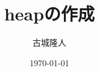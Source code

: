 \documentclass[a4paper,11pt]{jsarticle}
\begin{document}
\title{heapの作成}
\author{古城隆人}
\date{\today}
\maketitle
\end{document}
